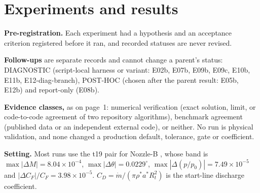 \section{Experiments and results}\label{sec:experiments}

\textbf{Pre-registration.} Each experiment had a hypothesis and an acceptance
criterion registered before it ran, and recorded statuses are never revised.

\textbf{Follow-ups} are separate records and cannot change a parent's status: DIAGNOSTIC
(script-local harness or variant: E02b, E07b, E09b, E09c, E10b, E11b,
E12-diag-branch), POST-HOC (chosen after the parent result: E05b, E12b) and report-only
(E08b).

\textbf{Evidence classes,} as on page~1: numerical verification (exact solution,
limit, or code-to-code agreement of two repository algorithms), benchmark agreement
(published data or an independent external code), or neither. No run is physical
validation, and none changed a production default, tolerance, gate or coefficient.

\textbf{Setting.} Most runs use the t19 pair for Nozzle-B \cite{rao1958}, whose band is
$\max|\Delta M|=8.04\times10^{-4}$, $\max|\Delta\theta|=0.0229^\circ$,
$\max|\Delta(p/p_0)|=7.49\times10^{-5}$ and $|\Delta C_F|/C_F=3.98\times10^{-5}$.
$C_D=\dot m/(\pi\rho^*a^*R_t^2)$ is the start-line discharge coefficient.

